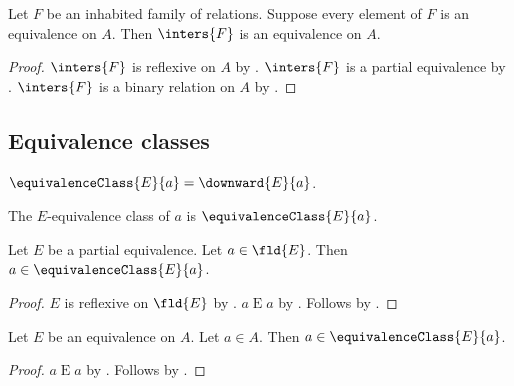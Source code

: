\begin{proposition}\label{inters_of_family_of_equivalences_on_a_set_is_equivalence_on_that_set}
    Let $F$ be an inhabited family of relations.
    Suppose every element of $F$ is an equivalence on $A$.
    Then $\inters{F}$ is an equivalence on $A$.
\end{proposition}
\begin{proof}
    $\inters{F}$ is reflexive on $A$ by .
    $\inters{F}$ is a partial equivalence by
        .
    $\inters{F}$ is a binary relation on $A$ by
        .
\end{proof}


\subsection{Equivalence classes}

\begin{abbreviation}\label{equiv_class}
    $\equivalenceClass{E}{a} = \downward{E}{a}$.
\end{abbreviation}

\begin{abbreviation}\label{equivclass_abbr}
    The $E$-equivalence class of $a$ is $\equivalenceClass{E}{a}$.
\end{abbreviation}

\begin{proposition}\label{partialequivalence_equivclass_inhabited}
    Let $E$ be a partial equivalence.
    Let $a\in \fld{E}$.
    Then $a\in\equivalenceClass{E}{a}$.
\end{proposition}
\begin{proof}
    $E$ is reflexive on $\fld{E}$ by
        .
    $a\mathrel{E} a$ by .
    Follows by .
\end{proof}

\begin{proposition}\label{equivclasses_inhabited_equivalenceon}
    Let $E$ be an equivalence on $A$.
    Let $a\in A$.
    Then $a\in\equivalenceClass{E}{a}$.
\end{proposition}
\begin{proof}
    $a\mathrel{E} a$ by .
    Follows by .
\end{proof}


